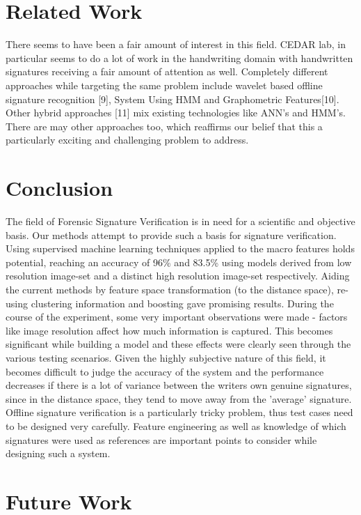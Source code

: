 \documentclass{article}
\begin{document}
\section{Related Work}

There seems to have been a fair amount of interest in this field. CEDAR lab, in particular seems to do a lot of work in the handwriting domain with handwritten signatures receiving a fair amount of attention as well. Completely different approaches while targeting the same problem include wavelet based offline signature recognition [9], System Using HMM and Graphometric Features[10]. Other hybrid approaches [11] mix existing technologies like ANN's and HMM's. There are may other approaches too, which reaffirms our belief that this a particularly exciting and challenging problem to address.

\section{Conclusion}
The field of Forensic Signature Verification is in need for a scientific and objective basis. Our methods attempt to provide such a basis for signature verification. Using supervised machine learning techniques applied to the macro features holds potential, reaching an accuracy of 96\% and 83.5\% using models derived from low resolution image-set and a distinct high resolution image-set respectively. Aiding the current methods by feature space transformation (to the distance space), re-using clustering information and boosting gave promising results. During the course of the experiment, some very important observations were made - factors like image resolution affect how much information is captured. This becomes significant while building a model and these effects were clearly seen through the various testing scenarios. Given the highly subjective nature of this field, it becomes difficult to judge the accuracy of the system and the performance decreases if there is a lot of variance between the writers own genuine signatures, since in the distance space, they tend to move away from the 'average' signature. Offline signature verification is a particularly tricky problem, thus test cases need to be designed very carefully. Feature engineering as well as knowledge of which signatures were used as references are important points to consider while designing such a system.

\section{Future Work}
\end{document}
